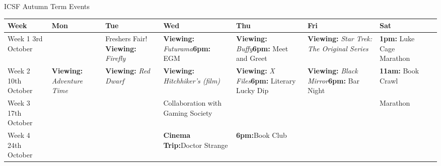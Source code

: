 \begin{landscape}
\noindent

\begin{center}
{\Large ICSF Autumn Term Events}
\end{center}

\scriptsize
\begin{tabular}{p{16mm}|p{31mm}p{31mm}p{31mm}p{31mm}p{31mm}p{31mm}p{0mm}}
		Week & Mon & Tue & Wed & Thu & Fri & Sat\footnotemark[1] & 
	\\
	\hline
		 Week 1 \newline 3rd \newline October &
			&
			Freshers Fair! 
			\newline \textbf{Viewing:} \textit{Firefly}\footnotemark[2]&
			\textbf{Viewing:} \textit{Futurama}\footnotemark[2]
			\newline\textbf{6pm:} EGM&
			\textbf{Viewing:} \textit{Buffy}\footnotemark[2]
			\newline\textbf{6pm:} Meet and Greet \footnotemark[3]&
			\textbf{Viewing:} \textit{Star Trek:} \newline \textit {The Original Series}\footnotemark[2]&
			\textbf{1pm:} Luke Cage \newline Marathon&
	\\
		 Week 2 \newline 10th \newline October &
			\textbf{Viewing:} \textit{Adventure Time} \footnotemark[2]&
			\textbf{Viewing:} \textit{Red Dwarf}\footnotemark[2] &
			\textbf{Viewing:} \textit{Hitchhiker's (film)}\footnotemark[2]&
			\textbf{Viewing:} \textit{X Files}\footnotemark[2]
			\newline\textbf{6pm:} Literary Lucky Dip&
			\textbf{Viewing:} \newline \textit{Black Mirror}\footnotemark[2]
			\newline\textbf{6pm:} Bar Night & 
			\textbf{11am:} Book Crawl&
	\\
		 Week 3 \newline 17th \newline October &
		 	&
		 	&
			Collaboration with Gaming Society \footnotemark[4]&
			&
			&
			Marathon \footnotemark[4]&
	\\
		 Week 4 \newline 24th \newline October &
			&
			&
			\textbf{Cinema Trip:}\newline Doctor Strange \footnotemark[4]&
			\textbf{6pm:}\newline Book Club \footnotemark[4]&
			&
			&
			

\end{tabular}
\end{landscape}

